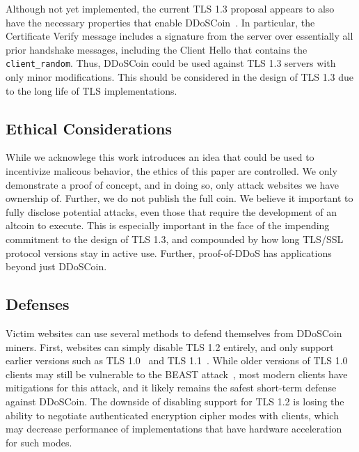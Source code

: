 
Although not yet implemented, the current TLS 1.3 proposal appears to also have the
necessary properties that enable DDoSCoin~\cite{tls-draft}. In particular, the
Certificate Verify message includes a signature from the server over essentially
all prior handshake messages, including the Client Hello that contains the
\texttt{client\_random}. Thus, DDoSCoin could be used against TLS 1.3
servers with only minor modifications. This should be considered in the design of 
TLS 1.3 due to the long life of TLS implementations.



\subsection{Ethical Considerations}
While we acknowlege this work introduces an idea that could be used to incentivize 
malicous behavior, the ethics of this paper are controlled. We only demonstrate a 
proof of concept, and in doing so, only attack websites we have ownership of.
Further, we do not publish the full coin.
We believe it important to fully disclose potential attacks, even those that
require the development of an altcoin to execute. This is especially important in the
face of the impending commitment to the design of TLS 1.3, and compounded by how long 
TLS/SSL protocol versions stay in active use. Further, proof-of-DDoS has applications 
beyond just DDoSCoin.


\subsection{Defenses}
\label{sec:defense}

Victim websites can use several methods to defend themselves from
DDoSCoin miners. First, websites can simply disable TLS 1.2 entirely, and only
support earlier versions such as TLS 1.0~\cite{rfc2246} and TLS
1.1~\cite{rfc4346}. While older versions of
TLS 1.0 clients may still be vulnerable to the BEAST attack~\cite{beast}, most
modern clients have mitigations for this attack, and it likely remains the
safest short-term defense against DDoSCoin. The downside of disabling support
for TLS 1.2 is losing the ability to negotiate authenticated encryption cipher
modes with clients, which may decrease performance of implementations that have
hardware acceleration for such modes.

